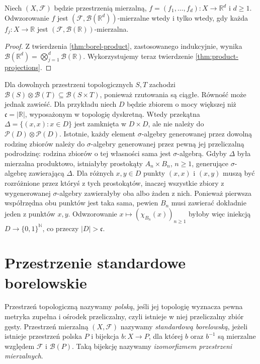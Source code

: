 \begin{wniosek}
\label{cor:coordinate-measurable}
Niech $(X,\mathcal F)$ będzie przestrzenią mierzalną,
$f=(f_1,\ldots,f_d):X\to\mathbb R^d$ i $d\ge1$.
Odwzorowanie $f$ jest $(\mathcal F,\mathcal B(\mathbb R^d))$-mierzalne
wtedy i tylko wtedy, gdy każda $f_j:X\to\mathbb R$
jest $(\mathcal F,\mathcal B(\mathbb R))$-mierzalna.
\end{wniosek}
\begin{proof}
Z twierdzenia \ref{thm:borel-product}, zastosowanego
indukcyjnie, wynika
$\mathcal B(\mathbb R^d)=\bigotimes_{j=1}^d\mathcal B(\mathbb R)$.
Wykorzystujemy teraz twierdzenie \ref{thm:product-projections}.
\end{proof}

\begin{uwaga}
Dla dowolnych przestrzeni topologicznych $S,T$ zachodzi
$\mathcal B(S)\otimes\mathcal B(T)\subseteq\mathcal B(S\times T)$,
ponieważ rzutowania są ciągłe. Równość może jednak zawieść.
Dla przykładu niech $D$ będzie zbiorem o mocy większej niż
$\mathfrak c=|\mathbb R|$, wyposażonym w topologię dyskretną.
Wtedy przekątna $\Delta=\{(x,x):x\in D\}$ jest zamknięta
w $D\times D$, ale nie należy do
$\mathcal P(D)\otimes\mathcal P(D)$.
Istotnie, każdy element $\sigma$-algebry generowanej
przez dowolną rodzinę zbiorów należy do $\sigma$-algebry
generowanej przez pewną jej przeliczalną podrodzinę:
rodzina zbiorów o tej własności sama jest $\sigma$-algebrą.
Gdyby $\Delta$ była mierzalna produktowo, istniałyby
prostokąty $A_n\times B_n$, $n\ge1$, generujące
$\sigma$-algebrę zawierającą $\Delta$.
Dla różnych $x,y\in D$ punkty $(x,x)$ i $(x,y)$
muszą być rozróżnione przez któryś z tych prostokątów,
inaczej wszystkie zbiory z wygenerowanej $\sigma$-algebry
zawierałyby oba albo żaden z nich. Ponieważ pierwsza
współrzędna obu punktów jest taka sama, pewien $B_n$
musi zawierać dokładnie jeden z punktów $x,y$.
Odwzorowanie $x\mapsto(\chi_{B_n}(x))_{n\ge1}$
byłoby więc iniekcją $D\to\{0,1\}^{\mathbb N}$, co
przeczy $|D|>\mathfrak c$.
\end{uwaga}

\section{Przestrzenie standardowe borelowskie}

\begin{definicja}
\label{def:standard-borel}
Przestrzeń topologiczną nazywamy \emph{polską}, jeśli
jej topologię wyznacza pewna metryka zupełna i ośrodek
przeliczalny, czyli istnieje w niej przeliczalny zbiór
gęsty. Przestrzeń mierzalną $(X,\mathcal F)$ nazywamy
\emph{standardową borelowską}, jeżeli istnieje przestrzeń
polska $P$ i bijekcja $b:X\to P$, dla której
$b$ oraz $b^{-1}$ są mierzalne względem
$\mathcal F$ i $\mathcal B(P)$. Taką bijekcję
nazywamy \emph{izomorfizmem przestrzeni mierzalnych}.
\end{definicja}

